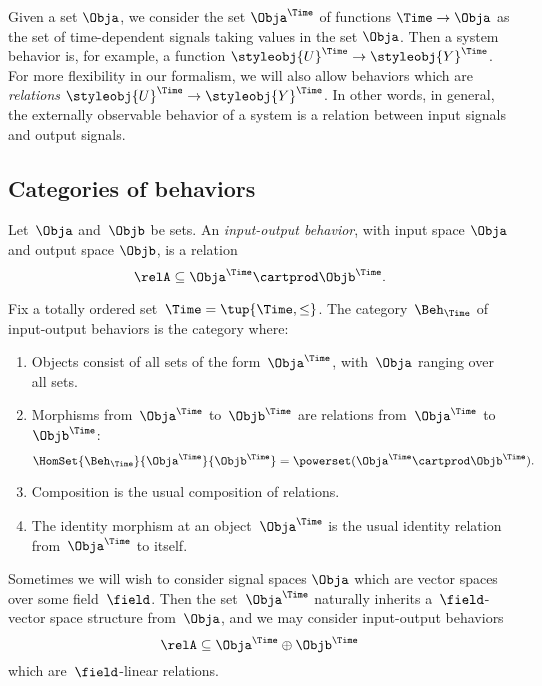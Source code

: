 Given a set $\Obja$, we consider the set $\Obja^\Time$ of functions $\Time \to \Obja$ as the set of time-dependent signals taking values in the set $\Obja$.
Then a system behavior is, for example, a function $\styleobj{U}^\Time \to \styleobj{Y}^\Time$.
For more flexibility in our formalism, we will also allow behaviors which are \emph{relations} $\styleobj{U}^\Time \to \styleobj{Y}^\Time$.
In other words, in general, the externally observable behavior of a system is a relation between input signals and output signals.

\subsection{Categories of behaviors}

\begin{definition}
    Let~$\Obja$ and~$\Objb$ be sets.
    An \emph{input-output behavior}, with input space $\Obja$ and output space $\Objb$, is a relation
    \begin{equation*}
        \relA \subseteq \Obja^\Time \cartprod \Objb^\Time.
    \end{equation*}
\end{definition}

\begin{definition}
    Fix a totally ordered set~$\Time = \tup{\Time, \leq}$.
    The category~$\Beh_\Time$ of input-output behaviors is the category where:
    \begin{enumerate}
        \item Objects consist of all sets of the form~$\Obja^\Time$, with~$\Obja$ ranging over all sets.
        \item Morphisms from~$\Obja^\Time$ to~$\Objb^\Time$ are relations from~$\Obja^\Time$ to~$\Objb^\Time$:
              \begin{equation}
                  \HomSet{\Beh_\Time}{\Obja^\Time}{\Objb^\Time} = \powerset (\Obja^\Time \cartprod \Objb^\Time).
              \end{equation}
        \item Composition is the usual composition of relations.
        \item The identity morphism at an object~$\Obja^\Time$ is the usual identity relation from~$\Obja^\Time$ to itself.
    \end{enumerate}
\end{definition}

Sometimes we will wish to consider signal spaces $\Obja$ which are vector spaces over some field~$\field$.
Then the set~$\Obja^\Time$ naturally inherits a~$\field$-vector space structure from~$\Obja$, and we may consider input-output behaviors
\begin{equation*}
    \relA \subseteq \Obja^\Time \oplus \Objb^\Time
\end{equation*}
which are~$\field$-linear relations.

